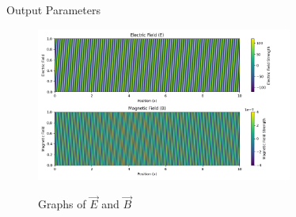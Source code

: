 \documentclass[journal,12pt,twocolumn]{IEEEtran}
\theoremstyle{remark}
\begin{document}
\bigskip

\begin{center}
    \begin{table}[ht]
        \caption{Output Parameters}
        
        \label{tab:table2.12.8.8}
    \end{table}
\end{center}

\renewcommand{\thefigure}{\theenumi}
\renewcommand{\thetable}{\theenumi}

\newpage

\begin{flushleft}
\begin{figure}[ht]
\renewcommand\thefigure{1}
  \caption{Graphs of $\vec{E}$ and $\vec{B}$}
  \includegraphics[width=0.75\textwidth]{figs/fig1.png}
  \label{fig:graph}
\end{figure}
\end{flushleft}
\end{document}
